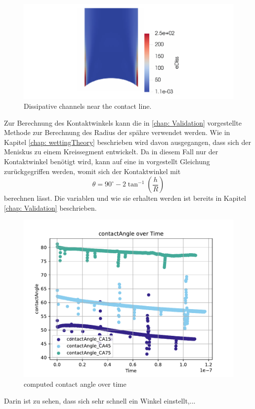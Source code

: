 \begin{figure}[h]
    \centering
    \includegraphics[width=.95\textwidth]{Pictures/eDiss_Wedge.pdf}
    \caption{Dissipative channels near the contact line.}
    \label{fig: eDiss_wedge}
\end{figure}

Zur Berechnung des Kontaktwinkels kann die in \ref*{chap: Validation} vorgestellte Methode zur Berechnung des Radius der spähre verwendet werden. Wie in Kapitel \ref*{chap: wettingTheory} beschrieben wird davon ausgegangen, dass sich der Meniskus zu einem Kreissegment entwickelt. Da in diesem Fall nur der Kontaktwinkel benötigt wird, kann auf eine in \cite{buttPhysicsChemistryInterfaces} vorgestellt Gleichung zurückgegriffen werden, womit sich der Kontaktwinkel mit 
\begin{equation}
    \theta = 90^{\circ}- 2\tan^{-1}\left(\frac{h}{R}\right) 
\end{equation}
berechnen lässt. Die variablen und wie sie erhalten werden ist bereits in Kapitel \ref*{chap: Validation} beschrieben. 
\begin{figure}[h]
    \centering
    \includegraphics[width=.95\textwidth]{Pictures/contactAngle_overTime.pdf}
    \caption{computed contact angle over time }
    \label{fig: eDiss_wedge}
\end{figure}
Darin ist zu sehen, dass sich sehr schnell ein Winkel einstellt,... 

